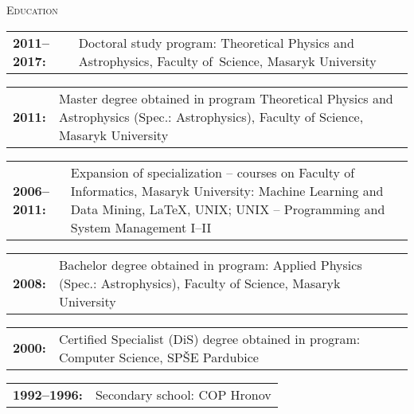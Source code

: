 \documentclass[10pt]{article}
\begin{document}
\begin{cv}
\noindent\hrulefill
\begin{cvlist}{\large \textsc{Education}}
\item \begin{tabular}{p{2.8cm}p{11cm}} \vspace{0.2cm} {\bf{2011--2017:}} & \vspace{0.2cm} Doctoral study program:
  Theoretical Physics and Astrophysics, Faculty of~Science, Masaryk
  University
 \end{tabular}
 \item \begin{tabular}{p{2.8cm}p{11cm}} {\bf{2011:}} & Master
   degree obtained in program Theoretical Physics and Astrophysics
   (Spec.: Astrophysics), Faculty of Science, Masaryk University
\end{tabular}
\item \begin{tabular}{p{2.8cm}p{11cm}} {\bf{2006--2011:}} &
  Expansion of specialization -- courses on Faculty of Informatics,
  Masaryk University: Machine Learning and Data Mining, \LaTeX, UNIX;
  UNIX -- Programming and System Management I--II
 \end{tabular}
  \item \begin{tabular}{p{2.8cm}p{11cm}} {\bf{2008:}} &
    Bachelor degree obtained in program: Applied Physics (Spec.:
    Astrophysics), Faculty of Science, Masaryk University
  \end{tabular}


  \item \begin{tabular}{p{2.8cm}p{11cm}} {\bf{2000:}} & Certified
    Specialist (DiS) degree obtained in program: Computer Science,
    SPŠE Pardubice
  \end{tabular}


  \item \begin{tabular}{p{2.8cm}p{11cm}}
   {\bf{1992--1996:}} & Secondary school: COP Hronov
   \end{tabular}
   

\end{cvlist}
\end{cv}
\end{document}
